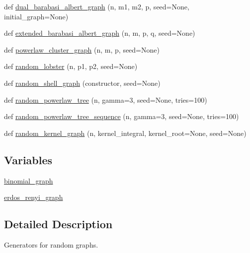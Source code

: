 \begin{DoxyCompactItemize}
\item 
def \hyperlink{namespacenetworkx_1_1generators_1_1random__graphs_adcdef09c96b457884a88ee782ada9b9c}{dual\+\_\+barabasi\+\_\+albert\+\_\+graph} (n, m1, m2, p, seed=None, initial\+\_\+graph=None)
\item 
def \hyperlink{namespacenetworkx_1_1generators_1_1random__graphs_a0ad298aab20b5729ec16794e20be71dd}{extended\+\_\+barabasi\+\_\+albert\+\_\+graph} (n, m, p, q, seed=None)
\item 
def \hyperlink{namespacenetworkx_1_1generators_1_1random__graphs_a19a5fada577037fdba365f25342966d0}{powerlaw\+\_\+cluster\+\_\+graph} (n, m, p, seed=None)
\item 
def \hyperlink{namespacenetworkx_1_1generators_1_1random__graphs_ab8b1774ba3dc8a4363991626409dff1e}{random\+\_\+lobster} (n, p1, p2, seed=None)
\item 
def \hyperlink{namespacenetworkx_1_1generators_1_1random__graphs_a674ef4e36f93607269fd256728beb214}{random\+\_\+shell\+\_\+graph} (constructor, seed=None)
\item 
def \hyperlink{namespacenetworkx_1_1generators_1_1random__graphs_adee8cf3717a21fcf18caa925ae154225}{random\+\_\+powerlaw\+\_\+tree} (n, gamma=3, seed=None, tries=100)
\item 
def \hyperlink{namespacenetworkx_1_1generators_1_1random__graphs_a3bf437659d4f4f71b23f22b6bd701a73}{random\+\_\+powerlaw\+\_\+tree\+\_\+sequence} (n, gamma=3, seed=None, tries=100)
\item 
def \hyperlink{namespacenetworkx_1_1generators_1_1random__graphs_a00602f80081a0a81a58385f95299f594}{random\+\_\+kernel\+\_\+graph} (n, kernel\+\_\+integral, kernel\+\_\+root=None, seed=None)
\end{DoxyCompactItemize}
\subsection*{Variables}
\begin{DoxyCompactItemize}
\item 
\hyperlink{namespacenetworkx_1_1generators_1_1random__graphs_a6fa50eb1a47527d3e8e7c511d1533d7a}{binomial\+\_\+graph}
\item 
\hyperlink{namespacenetworkx_1_1generators_1_1random__graphs_a0603952c3cb3e823a4fcf232a7629fd5}{erdos\+\_\+renyi\+\_\+graph}
\end{DoxyCompactItemize}


\subsection{Detailed Description}
\begin{DoxyVerb}Generators for random graphs.\end{DoxyVerb}
 

